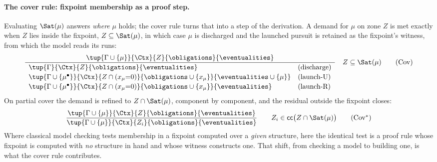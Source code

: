 \paragraph{The cover rule: fixpoint membership as a proof step.}
Evaluating $\Sat(\mu)$ answers \emph{where} $\mu$ holds; the cover rule turns that into a step of the
derivation. A demand for $\mu$ on zone $Z$ is met exactly when $Z$ lies inside the fixpoint,
$Z\subseteq\Sat(\mu)$, in which case $\mu$ is discharged and the launched pursuit is retained as the
fixpoint's witness, from which the model reads its runs:
\[
\frac{\tup{\Gamma\cup\{\mu\}}{\Ctx}{Z}{\obligations}{\eventualities}}
{\begin{array}{ll}
\tup{\Gamma}{\Ctx}{Z}{\obligations}{\eventualities} & (\text{discharge})\\[2pt]
\tup{\Gamma\cup\{\mu^\bullet\}}{\Ctx}{Z\cap(x_\mu{=}0)}{\obligations\cup\{x_\mu\}}{\eventualities\cup\{\mu\}} & (\text{launch-U})\\[2pt]
\tup{\Gamma\cup\{\mu^\bullet\}}{\Ctx}{Z\cap(x_\mu{=}0)}{\obligations\cup\{x_\mu\}}{\eventualities} & (\text{launch-R})
\end{array}}
\quad Z\subseteq\Sat(\mu)
\tag{\textrm{Cov}}\label{tag:chk}
\]
On partial cover the demand is refined to $Z\cap\Sat(\mu)$, component by component, and the residual outside
the fixpoint closes:
\[
\frac{\tup{\Gamma\cup\{\mu\}}{\Ctx}{Z}{\obligations}{\eventualities}}
{\tup{\Gamma\cup\{\mu\}}{\Ctx}{Z_i}{\obligations}{\eventualities}}
\qquad Z_i\in\mathsf{cc}\big(Z\cap\Sat(\mu)\big)
\tag{\textrm{Cov}$^{*}$}\label{tag:chkstar}
\]
Where classical model checking tests membership in a fixpoint computed over a \emph{given} structure, here
the identical test is a proof rule whose fixpoint is computed with \emph{no} structure in hand and whose
witness constructs one. That shift, from checking a model to building one, is what the cover rule
contributes.
